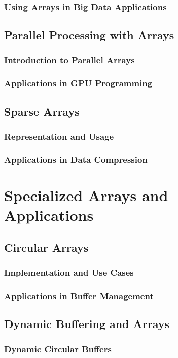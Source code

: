 \documentclass{book}
\begin{document}
	\subsection{Using Arrays in Big Data Applications}
	
	\section{Parallel Processing with Arrays}
	\subsection{Introduction to Parallel Arrays}
	\subsection{Applications in GPU Programming}
	
	\section{Sparse Arrays}
	\subsection{Representation and Usage}
	\subsection{Applications in Data Compression}
	
	\chapter{Specialized Arrays and Applications}
	\section{Circular Arrays}
	\subsection{Implementation and Use Cases}
	\subsection{Applications in Buffer Management}
	
	\section{Dynamic Buffering and Arrays}
	\subsection{Dynamic Circular Buffers}
\end{document}
